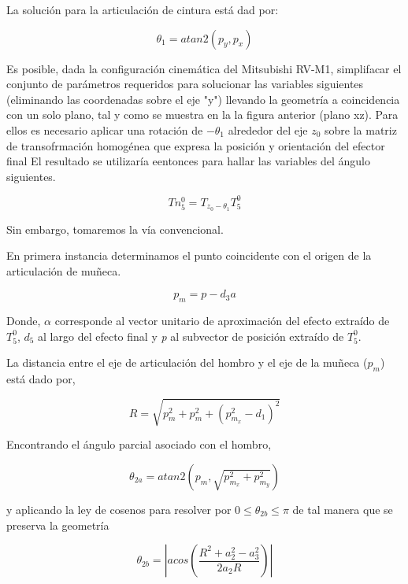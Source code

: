 \documentclass[letter,openright,12pt,spanish]{report}
\begin{document}
La soluci\'on para la articulaci\'on de cintura est\'a dad por:

\begin{displaymath}
\theta_1=atan2(p_y,p_x)
\end{displaymath}

Es posible, dada la configuraci\'on cinem\'atica del Mitsubishi RV-M1, simplifacar el conjunto de par\'ametros requeridos para solucionar las variables siguientes (eliminando las coordenadas sobre el eje "y") llevando la geometr\'ia a coincidencia con un solo plano, tal y como se muestra en la la figura anterior (plano xz). Para ellos es necesario aplicar una rotaci\'on de $-\theta_1$ alrededor del eje $z_0$ sobre la matriz de transofrmaci\'on homog\'enea que expresa la posici\'on y orientaci\'on del efector final El resultado se utilizar\'ia eentonces para hallar las variables del \'angulo siguientes.

\begin{displaymath}
Tn^0_5=T_{z_{0}-\theta_1}T^0_5
\end{displaymath}

Sin embargo, tomaremos la v\'ia convencional.

En primera instancia determinamos el punto coincidente con el origen de la articulaci\'on de mu\~neca.

\begin{displaymath}
p_m=p-d_3a
\end{displaymath}

Donde, $\alpha $ corresponde al vector unitario de aproximaci\'on del efecto extra\'ido de $T^0_5$, $d_5$ al largo del efecto final y \textit{p} al subvector de posici\'on extra\'ido de $T^0_5$.

La distancia entre el eje de articulaci\'on del hombro y el eje de la mu\~neca ($\textit{p}_m$) est\'a dado por,

\begin{displaymath}
R=\sqrt{p^2_m+p^2_m+(p^2_{m_x}-d_1)^2}
\end{displaymath}

Encontrando el  \'angulo parcial asociado con el hombro,

\begin{displaymath}
\theta_{2a}=atan2(p_m,\sqrt{p^2_{m_x}+p^2_{m_y}})
\end{displaymath}

y aplicando la ley de cosenos para resolver por $0\leq \theta_{2b}\leq \pi$ de tal manera que se preserva la geometr\'ia

\begin{displaymath}
\theta_{2b}=|acos(\frac{R^2+a^2_2-a^2_3}{2a_2R})|
\end{displaymath}
\end{document}
